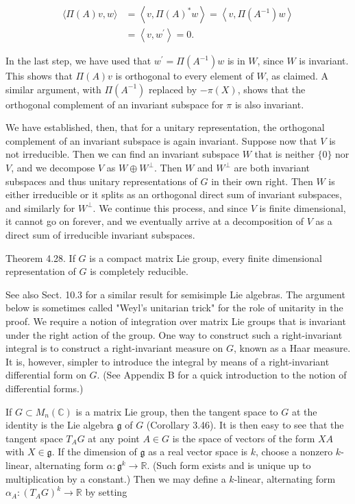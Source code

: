\documentclass[10pt, letterpaper]{article}
\begin{document}
$$
\begin{aligned}
\langle\Pi(A) v, w\rangle & =\left\langle v, \Pi(A)^{*} w\right\rangle=\left\langle v, \Pi\left(A^{-1}\right) w\right\rangle \\
& =\left\langle v, w^{\prime}\right\rangle=0 .
\end{aligned}
$$

In the last step, we have used that $w^{\prime}=\Pi\left(A^{-1}\right) w$ is in $W$, since $W$ is invariant. This shows that $\Pi(A) v$ is orthogonal to every element of $W$, as claimed. A similar argument, with $\Pi\left(A^{-1}\right)$ replaced by $-\pi(X)$, shows that the orthogonal complement of an invariant subspace for $\pi$ is also invariant.

We have established, then, that for a unitary representation, the orthogonal complement of an invariant subspace is again invariant. Suppose now that $V$ is not irreducible. Then we can find an invariant subspace $W$ that is neither $\{0\}$ nor $V$, and we decompose $V$ as $W \oplus W^{\perp}$. Then $W$ and $W^{\perp}$ are both invariant subspaces and thus unitary representations of $G$ in their own right. Then $W$ is either irreducible or it splits as an orthogonal direct sum of invariant subspaces, and similarly for $W^{\perp}$. We continue this process, and since $V$ is finite dimensional, it cannot go on forever, and we eventually arrive at a decomposition of $V$ as a direct sum of irreducible invariant subspaces.

Theorem 4.28. If $G$ is a compact matrix Lie group, every finite dimensional representation of $G$ is completely reducible.

See also Sect. 10.3 for a similar result for semisimple Lie algebras. The argument below is sometimes called "Weyl's unitarian trick" for the role of unitarity in the\\
proof. We require a notion of integration over matrix Lie groups that is invariant under the right action of the group. One way to construct such a right-invariant integral is to construct a right-invariant measure on $G$, known as a Haar measure. It is, however, simpler to introduce the integral by means of a right-invariant differential form on $G$. (See Appendix B for a quick introduction to the notion of differential forms.)

If $G \subset M_{n}(\mathbb{C})$ is a matrix Lie group, then the tangent space to $G$ at the identity is the Lie algebra $\mathfrak{g}$ of $G$ (Corollary 3.46). It is then easy to see that the tangent space $T_{A} G$ at any point $A \in G$ is the space of vectors of the form $X A$ with $X \in \mathfrak{g}$. If the dimension of $\mathfrak{g}$ as a real vector space is $k$, choose a nonzero $k$-linear, alternating form $\alpha: \mathfrak{g}^{k} \rightarrow \mathbb{R}$. (Such form exists and is unique up to multiplication by a constant.) Then we may define a $k$-linear, alternating form $\alpha_{A}:\left(T_{A} G\right)^{k} \rightarrow \mathbb{R}$ by setting
\end{document}

